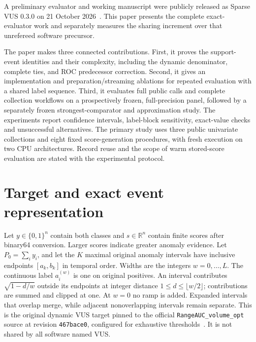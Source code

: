 A preliminary evaluator and working manuscript were publicly released as
Sparse VUS 0.3.0 on 21 October 2026~\cite{sparsevus03}. This paper presents the
complete exact-evaluator work and separately measures the sharing increment
over that unrefereed software precursor.

The paper makes three connected contributions. First, it proves the
support-event identities and their complexity, including the dynamic
denominator, complete ties, and ROC predecessor correction. Second, it gives
an implementation and preparation/streaming ablations for repeated evaluation
with a shared label sequence. Third, it evaluates full public calls and complete
collection workflows on a prospectively frozen, full-precision panel, followed
by a separately frozen strongest-comparator and approximation study. The
experiments report confidence intervals, label-block sensitivity, exact-value
checks and unsuccessful alternatives. The primary study uses three public
univariate collections and eight fixed score-generation procedures, with fresh
execution on two CPU architectures. Record reuse and the scope of warm
stored-score evaluation are stated with the experimental protocol.
\section{Target and exact event representation}
Let $y\in\{0,1\}^n$ contain both classes and $s\in\mathbb{R}^n$ contain finite
scores after binary64 conversion. Larger scores indicate greater anomaly
evidence. Let $P_0=\sum_i y_i$, and let the $K$ maximal original anomaly
intervals have inclusive endpoints $[a_k,b_k]$ in temporal order. Widths are
the integers $w=0,\ldots,L$. The continuous label $a_i^{(w)}$ is one on
original positives. An interval contributes $\sqrt{1-d/w}$ outside its
endpoints at integer distance $1\le d\le\lfloor w/2\rfloor$; contributions
are summed and clipped at one. At $w=0$ no ramp is added. Expanded intervals
that overlap merge, while adjacent nonoverlapping intervals remain separate.
This is the original dynamic VUS target pinned to the official
\texttt{RangeAUC\_volume\_opt} source at revision
\texttt{467bace0}, configured for exhaustive thresholds~\cite{vusreference}.
It is not shared by all software named VUS.

